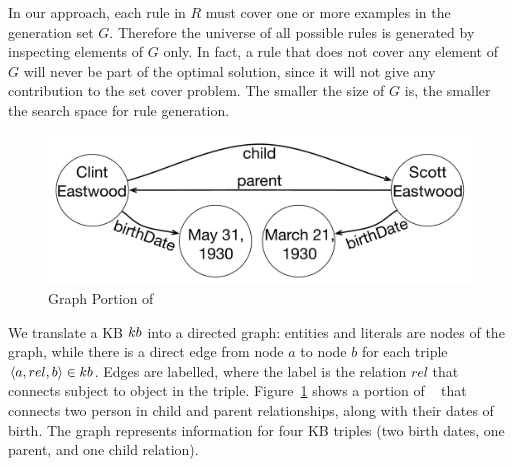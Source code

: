 In our approach, each rule in $R$ must cover one or more examples in the generation set $G$. 
Therefore the universe of all possible rules is generated by inspecting elements of $G$ only. 
In fact, a rule that does not cover any element of $G$ will never be part of the optimal solution, since it will not give any contribution to the set cover problem. %
The smaller the size of $G$ is, the smaller the search space for rule generation. 


\begin{figure}[ht]
	\centering
	\includegraphics[width=0.7\columnwidth]{include/figure/graph_example.pdf}
\vspace{-2.5ex}
	\caption{Graph Portion of \dbpedia}
	\label{fig:krd_graph_example}
\vspace{-1ex}
\end{figure}

We translate a KB ${\sc kb}$ into a directed graph: entities and literals are nodes of the graph, while there is a direct edge from node $a$ to node $b$ for each triple $\langle a,rel,b\rangle \in {\sc kb}$. 
Edges are labelled, where the label is the relation $rel$ that connects subject to object in the triple. Figure~\ref{fig:krd_graph_example} shows a portion of \dbpedia~\cite{bizer2009dbpedia} that connects two person in child and parent relationships, along with their dates of birth. The graph represents information for four KB triples (two birth dates, one parent, and one child relation).

